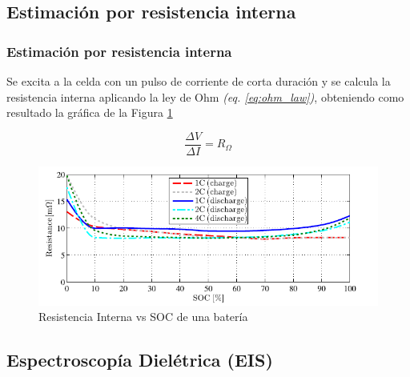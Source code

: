 \documentclass[10pt]{beamer}
\theoremstyle{remark}
\theoremstyle{definition}
\begin{document}
\subsection{Estimación por resistencia interna}


\begin{frame}[allowframebreaks]
  \frametitle{Estimación por resistencia interna}
	
  	Se excita a la celda con un pulso de corriente de corta duración y se
	calcula la resistencia interna aplicando la ley de Ohm
	\emph{(eq. \ref{eq:ohm_law})}, obteniendo como resultado la gráfica de la
	Figura \ref{fig:r_ohm_result}

	\begin{equation}
	\frac{\Delta V}{\Delta I} = R_\Omega
	  \label{eq:ohm_law}
	\end{equation}

	\framebreak
	\begin{figure}[h!]
	  \centering
	  \includegraphics[width=1\textwidth]{./images/Ro_vs_SOC.png}
	  \caption{Resistencia Interna vs SOC de una batería}
	  \label{fig:r_ohm_result}
	\end{figure}

\end{frame}

\subsection{Espectroscopía Dielétrica (EIS)}
\end{document}
